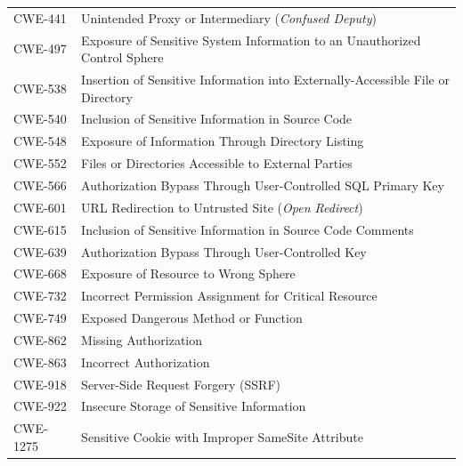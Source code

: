 \documentclass[11pt]{article}
\begin{document}
\begin{longtable}{@{}p{2.2cm}p{12.2cm}@{}}
CWE-441 & Unintended Proxy or Intermediary (\textit{Confused Deputy}) \\
CWE-497 & Exposure of Sensitive System Information to an Unauthorized Control Sphere \\
CWE-538 & Insertion of Sensitive Information into Externally-Accessible File or Directory \\
CWE-540 & Inclusion of Sensitive Information in Source Code \\
CWE-548 & Exposure of Information Through Directory Listing \\
CWE-552 & Files or Directories Accessible to External Parties \\
CWE-566 & Authorization Bypass Through User-Controlled SQL Primary Key \\
CWE-601 & URL Redirection to Untrusted Site (\textit{Open Redirect}) \\
CWE-615 & Inclusion of Sensitive Information in Source Code Comments \\
CWE-639 & Authorization Bypass Through User-Controlled Key \\
CWE-668 & Exposure of Resource to Wrong Sphere \\
CWE-732 & Incorrect Permission Assignment for Critical Resource \\
CWE-749 & Exposed Dangerous Method or Function \\
CWE-862 & Missing Authorization \\
CWE-863 & Incorrect Authorization \\
CWE-918 & Server-Side Request Forgery (SSRF) \\
CWE-922 & Insecure Storage of Sensitive Information \\
CWE-1275 & Sensitive Cookie with Improper SameSite Attribute \\

\end{longtable}
\end{document}
